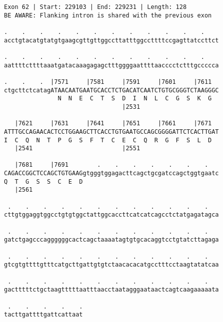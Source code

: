 \documentclass{article}
\begin{document}
\begin{Verbatim}
Exon 62 | Start: 229103 | End: 229231 | Length: 128
BE AWARE: Flanking intron is shared with the previous exon
 
.    .    .    .    .    .    .    .    .    .    .    .    
acctgtacatgtatgtgaagcgttgttggccttatttggccttttccgagttatccttct
  
.    .    .    .    .    .    .    .    .    .    .    .    
aattttcttttaaatgatacaaagagagctttggggaattttaacccctctttgccccca
  
.    .    .  |7571     |7581     |7591     |7601     |7611  
ctgcttctcatagATAACAATGAATGCACCTCTGACATCAATCTGTGCGGGTCTAAGGGC
               N  N  E  C  T  S  D  I  N  L  C  G  S  K  G  
                                 |2531                      
  
   |7621     |7631     |7641     |7651     |7661     |7671  
ATTTGCCAGAACACTCCTGGAAGCTTCACCTGTGAATGCCAGCGGGGATTCTCACTTGAT
I  C  Q  N  T  P  G  S  F  T  C  E  C  Q  R  G  F  S  L  D  
   |2541                         |2551                      
  
   |7681     |7691        .    .    .    .    .    .    .   
CAGACCGGCTCCAGCTGTGAAGgtgggtggagacttcagctgcgatccagctggtgaatc
Q  T  G  S  S  C  E  D                                      
   |2561                                                    
  
 .    .    .    .    .    .    .    .    .    .    .    .   
cttgtggaggtggcctgtgtggctattggcaccttcatcatcagcctctatgagatagca
  
 .    .    .    .    .    .    .    .    .    .    .    .   
gatctgagcccaggggggcactcagctaaaatagtgtgcacaggtcctgtatcttagaga
  
 .    .    .    .    .    .    .    .    .    .    .    .   
gtcgtgttttgtttcatgcttgattgtgtctaacacacatgcctttcctaagtatatcaa
  
 .    .    .    .    .    .    .    .    .    .    .    .   
gactttttctgctaagtttttaatttaacctaatagggaataactcagtcaagaaaaata
  
 .    .    .    .    .
tacttgattttgattcattaat
\end{Verbatim}
\newpage
\end{document}

